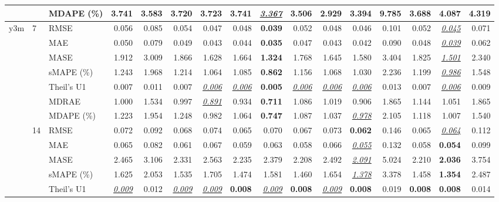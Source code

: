 \begin{table}[!htbp]
{\begin{tabular}{lllrrrrrrrrrrrrr}
 &  & MDAPE (\%) & 3.741 & 3.583 & 3.720 & 3.723 & 3.741 & \underline{\textit{3.367}} & 3.506 & \textbf{2.929} & 3.394 & 9.785 & 3.688 & 4.087 & 4.319 \\
\midrule
y3m & 7 & RMSE & 0.056 & 0.085 & 0.054 & 0.047 & 0.048 & \textbf{0.039} & 0.052 & 0.048 & 0.046 & 0.101 & 0.052 & \underline{\textit{0.045}} & 0.071 \\
 &  & MAE & 0.050 & 0.079 & 0.049 & 0.043 & 0.044 & \textbf{0.035} & 0.047 & 0.043 & 0.042 & 0.090 & 0.048 & \underline{\textit{0.039}} & 0.062 \\
 &  & MASE & 1.912 & 3.009 & 1.866 & 1.628 & 1.664 & \textbf{1.324} & 1.768 & 1.645 & 1.580 & 3.404 & 1.825 & \underline{\textit{1.501}} & 2.340 \\
 &  & sMAPE (\%) & 1.243 & 1.968 & 1.214 & 1.064 & 1.085 & \textbf{0.862} & 1.156 & 1.068 & 1.030 & 2.236 & 1.199 & \underline{\textit{0.986}} & 1.548 \\
 &  & Theil's U1 & 0.007 & 0.011 & 0.007 & \underline{\textit{0.006}} & \underline{\textit{0.006}} & \textbf{0.005} & \underline{\textit{0.006}} & \underline{\textit{0.006}} & \underline{\textit{0.006}} & 0.013 & 0.007 & \underline{\textit{0.006}} & 0.009 \\
 &  & MDRAE & 1.000 & 1.534 & 0.997 & \underline{\textit{0.891}} & 0.934 & \textbf{0.711} & 1.086 & 1.019 & 0.906 & 1.865 & 1.144 & 1.051 & 1.865 \\
 &  & MDAPE (\%) & 1.223 & 1.954 & 1.248 & 0.982 & 1.064 & \textbf{0.747} & 1.087 & 1.037 & \underline{\textit{0.978}} & 2.105 & 1.118 & 1.007 & 1.540 \\
\cmidrule(lr){2-16}
 & 14 & RMSE & 0.072 & 0.092 & 0.068 & 0.074 & 0.065 & 0.070 & 0.067 & 0.073 & \textbf{0.062} & 0.146 & 0.065 & \underline{\textit{0.064}} & 0.112 \\
 &  & MAE & 0.065 & 0.082 & 0.061 & 0.067 & 0.059 & 0.063 & 0.058 & 0.066 & \underline{\textit{0.055}} & 0.132 & 0.058 & \textbf{0.054} & 0.099 \\
 &  & MASE & 2.465 & 3.106 & 2.331 & 2.563 & 2.235 & 2.379 & 2.208 & 2.492 & \underline{\textit{2.091}} & 5.024 & 2.210 & \textbf{2.036} & 3.754 \\
 &  & sMAPE (\%) & 1.625 & 2.053 & 1.535 & 1.705 & 1.474 & 1.581 & 1.460 & 1.654 & \underline{\textit{1.378}} & 3.378 & 1.458 & \textbf{1.354} & 2.487 \\
 &  & Theil's U1 & \underline{\textit{0.009}} & 0.012 & \underline{\textit{0.009}} & \underline{\textit{0.009}} & \textbf{0.008} & \underline{\textit{0.009}} & \textbf{0.008} & \underline{\textit{0.009}} & \textbf{0.008} & 0.019 & \textbf{0.008} & \textbf{0.008} & 0.014 \\

\end{tabular}}
\end{table}

